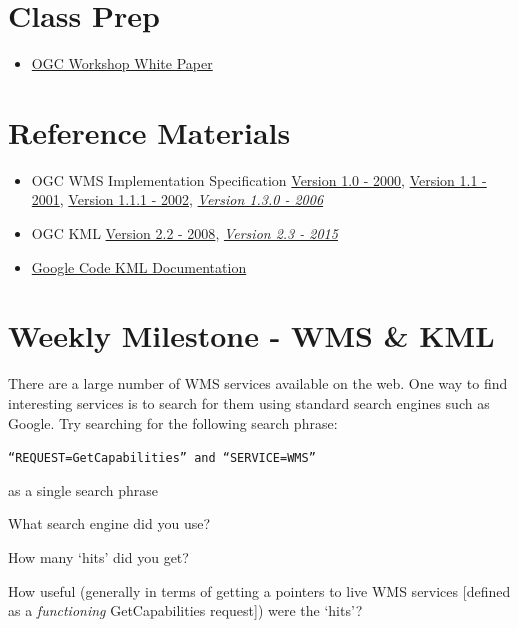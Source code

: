 \documentclass[]{book}
\providecommand{\tightlist}{%
  \setlength{\itemsep}{0pt}\setlength{\parskip}{0pt}}
\begin{document}
\section{Class Prep}\label{week06-prep}

\begin{itemize}
\tightlist
\item
  \href{http://karlbenedict.com/documents/ogcworkshop.pdf}{OGC Workshop
  White Paper}
\end{itemize}

\section{Reference Materials}\label{week06-reference}

\begin{itemize}
\item
  OGC WMS Implementation Specification
  \href{http://portal.opengeospatial.org/files/?artifact_id=7196}{Version
  1.0 - 2000},
  \href{http://portal.opengeospatial.org/files/?artifact_id=1058}{Version
  1.1 - 2001},
  \href{http://portal.opengeospatial.org/files/?artifact_id=1081\&version=1\&format=pdf}{Version
  1.1.1 - 2002},
  \href{http://portal.opengeospatial.org/files/?artifact_id=14416}{\emph{Version
  1.3.0 - 2006}}
\item
  OGC KML
  \href{http://portal.opengeospatial.org/files/?artifact_id=27810}{Version
  2.2 - 2008},
  \href{http://docs.opengeospatial.org/is/12-007r2/12-007r2.html}{\emph{Version
  2.3 - 2015}}
\item
  \href{https://developers.google.com/kml/documentation/}{Google Code
  KML Documentation}
\end{itemize}

\section{Weekly Milestone - WMS \& KML}\label{week06-milestone}

There are a large number of WMS services available on the web. One way
to find interesting services is to search for them using standard search
engines such as Google. Try searching for the following search phrase:

\texttt{“REQUEST=GetCapabilities”\ and\ “SERVICE=WMS”}

as a single search phrase

\begin{description}
\tightlist
\item[Question 1]
What search engine did you use?
\item[Question 2]
How many `hits' did you get?
\item[Question 3]
How useful (generally in terms of getting a pointers to live WMS
services {[}defined as a \emph{functioning} GetCapabilities request{]})
were the `hits'?
\end{description}
\end{document}
